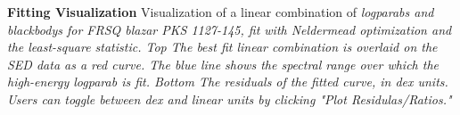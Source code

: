 \textbf{\label{fig:fitting_window} Fitting Visualization} Visualization of a linear combination of \em{logparab}s and \em{blackbody}s for FRSQ blazar PKS 1127-145, fit with Neldermead optimization and the least-square statistic. \em{Top} The best fit linear combination is overlaid on the SED data as a red curve. The blue line shows the spectral range over which the high-energy \em{logparab} is fit. \em{Bottom} The residuals of the fitted curve, in dex units. Users can toggle between dex and linear units by clicking "Plot Residulas/Ratios."